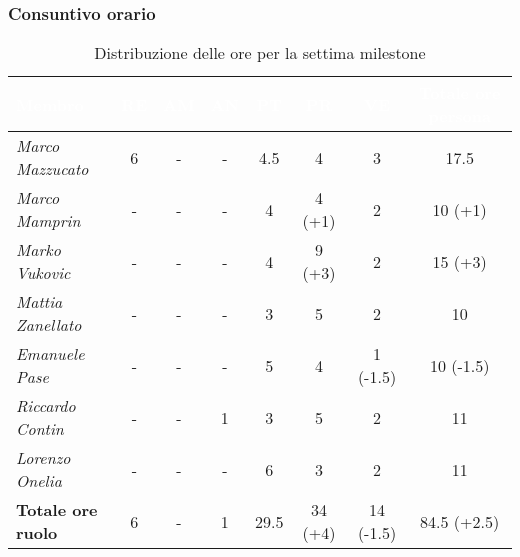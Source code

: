 \subsubsection{Consuntivo orario}
\begin{table}[H]
    \renewcommand\arraystretch{1.5}
    \small
    \centering
        \begin{tabular}{|l|c|c|c|c|c|c|c|}
            \hline
            \rowcolor[HTML]{036400}
            \textcolor{white}{\textbf{Membro}} & \multicolumn{1}{c|}{\textcolor{white}{\textbf{RE}}} & \multicolumn{1}{c|}{\textcolor{white}{\textbf{AM}}} & \multicolumn{1}{c|}{\textcolor{white}{\textbf{AN}}} & \multicolumn{1}{c|}{\textcolor{white}{\textbf{PT}}} & \multicolumn{1}{c|}{\textcolor{white}{\textbf{PR}}} & \multicolumn{1}{c|}{\textcolor{white}{\textbf{VE}}} & \multicolumn{1}{c|}{\textcolor{white}{\textbf{Totale ore persona}}} \\ \hline
            \rowcolor[HTML]{EFEFEF}\textit{Marco Mazzucato}  & 6         & -     & -          & 4.5    & 4        & 3  & 17.5       \\ \hline
            \rowcolor[HTML]{C0C0C0}\textit{Marco Mamprin}    & -         & -          & -          & 4          & 4 (+1)        & 2      & 10 (+1)       \\ \hline
            \rowcolor[HTML]{EFEFEF}\textit{Marko Vukovic}    & -         & -          & -          & 4    & 9 (+3)        & 2        & 15 (+3)       \\ \hline
            \rowcolor[HTML]{C0C0C0}\textit{Mattia Zanellato} & -         & -          & -          & 3          & 5        & 2   & 10       \\ \hline
            \rowcolor[HTML]{EFEFEF}\textit{Emanuele Pase}    & -         & -          & -          & 5    & 4       & 1 (-1.5)       & 10 (-1.5)       \\ \hline
            \rowcolor[HTML]{C0C0C0}\textit{Riccardo Contin}  & -         & -          & 1          & 3     & 5        & 2        & 11      \\ \hline
            \rowcolor[HTML]{EFEFEF}\textit{Lorenzo Onelia}   & -    & -          & -          & 6          & 3   & 2        & 11       \\ \hline
            \rowcolor[HTML]{C0C0C0}\textbf{Totale ore ruolo} & 6 & -    & 1          & 29.5    & 34 (+4)   & 14 (-1.5)       & 84.5 (+2.5)      \\ \hline
        \end{tabular}
    \caption{Distribuzione delle ore per la settima milestone}
\end{table}

